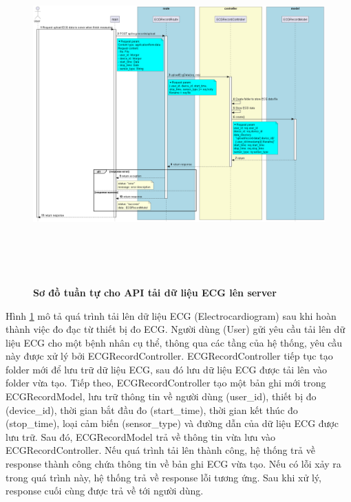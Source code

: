 \begin{enumerate}[a)]
\begin{figure}[H]
  \centering
  \includegraphics[width=16cm,height=13cm]{Images/server/sequence/server/uploadEcgData.png}
  \caption[Sơ đồ tuần tự cho API tải dữ liệu ECG lên server ]{\bfseries \fontsize{12pt}{0pt}
  \selectfont Sơ đồ tuần tự cho API tải dữ liệu ECG lên server }
  \label{uploadEcgData} %
\end{figure}
Hình \ref{uploadEcgData} mô tả quá trình tải lên dữ liệu ECG (Electrocardiogram) sau khi hoàn thành việc đo đạc từ thiết bị đo ECG. Người dùng (User) gửi yêu cầu tải lên dữ liệu ECG cho một bệnh nhân cụ thể, thông qua các tầng của hệ thống, yêu cầu này được xử lý bởi ECGRecordController. ECGRecordController tiếp tục tạo folder mới để lưu trữ dữ liệu ECG, sau đó lưu dữ liệu ECG được tải lên vào folder vừa tạo. Tiếp theo, ECGRecordController tạo một bản ghi mới trong ECGRecordModel, lưu trữ thông tin về người dùng (user\_id), thiết bị đo (device\_id), thời gian bắt đầu đo (start\_time), thời gian kết thúc đo (stop\_time), loại cảm biến (sensor\_type) và đường dẫn của dữ liệu ECG được lưu trữ. Sau đó, ECGRecordModel trả về thông tin vừa lưu vào ECGRecordController. Nếu quá trình tải lên thành công, hệ thống trả về response thành công chứa thông tin về bản ghi ECG vừa tạo. Nếu có lỗi xảy ra trong quá trình này, hệ thống trả về response lỗi tương ứng. Sau khi xử lý, response cuối cùng được trả về tới người dùng.




\end{enumerate}

